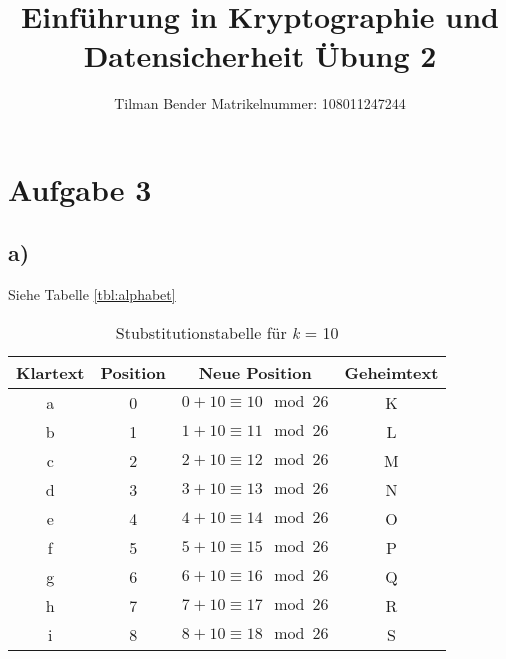 \documentclass[10pt,a4paper]{article}
\author{Tilman Bender   Matrikelnummer: 108011247244\\}
\title{Einführung in Kryptographie und Datensicherheit Übung 2}
\begin{document}
\maketitle
\section*{Aufgabe 3}
\subsection*{a)}
Siehe Tabelle \ref{tbl:alphabet}
\begin{table}[htdp]
\caption{Stubstitutionstabelle für \textsl{k} = 10}
\begin{center}
\begin{tabular}{|c|c|c|c|}
	Klartext & Position & Neue Position & Geheimtext\\ \hline
	a & 0 & \begin{math} 0 + 10 \equiv 10 \mod 26\end{math} & K \\ \hline
	b & 1 & \begin{math} 1 + 10 \equiv 11 \mod 26 \end{math} & L \\ \hline
	c & 2 & \begin{math} 2 + 10  \equiv 12  \mod 26 \end{math} & M \\ \hline
	d & 3 & \begin{math} 3 + 10  \equiv 13 \mod 26 \end{math}  & N \\ \hline
	e & 4 & \begin{math} 4 + 10 \equiv 14 \mod 26 \end{math}  & O \\ \hline
	f & 5 & \begin{math} 5 + 10 \equiv 15 \mod 26 \end{math}   & P \\ \hline
	g & 6 & \begin{math} 6 + 10 \equiv 16 \mod 26 \end{math}  & Q \\ \hline
	h & 7 & \begin{math} 7 + 10 \equiv 17 \mod 26 \end{math}  & R \\ \hline
	i & 8 & \begin{math} 8 + 10 \equiv 18 \mod 26 \end{math} & S \\ \hline

\end{tabular}
\end{center}
\end{table}
\end{document}
